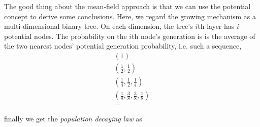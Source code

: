 \documentclass[aps,prl]{revtex4-2}
\begin{document}
The good thing about the mean-field approach is that we can use the potential concept to derive some conclusions. Here, we regard the growing mechanism as a multi-dimensional binary tree. On each dimension, the tree's $i$th layer has $i$ potential nodes. The probability on the $i$th node's generation is is the average of the two nearest nodes' potential generation probability, i.e. such a sequence,
\begin{align*}
(1)\\
(\frac{1}{2},\frac{1}{2})\\
(\frac{1}{4},\frac{1}{2},\frac{1}{4})\\
(\frac{1}{8},\frac{3}{8},\frac{3}{8},\frac{1}{8})\\
\dots
\end{align*}

finally we get the \emph{population decaying law} as 
\end{document}
